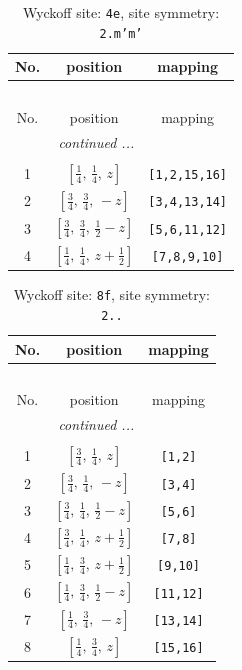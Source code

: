 \documentclass[fleqn,8pt]{jsarticle}
\begin{document}
\renewcommand{\arraystretch}{1.2}
\begin{longtable}{ccc}
\caption{Wyckoff site: {\tt 4e}, site symmetry: {\tt 2.m'm'}}
 \\
 \hline \hline
No. & position & mapping \\ \hline \endfirsthead

\multicolumn{2}{l}{\tablename\ \thetable{}} \\
 \hline \hline
No. & position & mapping \\ \hline \endhead

 \hline \hline
\multicolumn{2}{r}{\footnotesize\it continued ...} \\ \endfoot

 \hline \hline
\multicolumn{2}{r}{} \\ \endlastfoot

1 & $\left[ \frac{1}{4},\, \frac{1}{4},\, z \right]$ & {\tt [1,2,15,16]} \\ \hline
2 & $\left[ \frac{3}{4},\, \frac{3}{4},\, - z \right]$ & {\tt [3,4,13,14]} \\ \hline
3 & $\left[ \frac{3}{4},\, \frac{3}{4},\, \frac{1}{2} - z \right]$ & {\tt [5,6,11,12]} \\ \hline
4 & $\left[ \frac{1}{4},\, \frac{1}{4},\, z + \frac{1}{2} \right]$ & {\tt [7,8,9,10]} \\
\end{longtable}
\renewcommand{\arraystretch}{1.2}
\begin{longtable}{ccc}
\caption{Wyckoff site: {\tt 8f}, site symmetry: {\tt 2..}}
 \\
 \hline \hline
No. & position & mapping \\ \hline \endfirsthead

\multicolumn{2}{l}{\tablename\ \thetable{}} \\
 \hline \hline
No. & position & mapping \\ \hline \endhead

 \hline \hline
\multicolumn{2}{r}{\footnotesize\it continued ...} \\ \endfoot

 \hline \hline
\multicolumn{2}{r}{} \\ \endlastfoot

1 & $\left[ \frac{3}{4},\, \frac{1}{4},\, z \right]$ & {\tt [1,2]} \\ \hline
2 & $\left[ \frac{3}{4},\, \frac{1}{4},\, - z \right]$ & {\tt [3,4]} \\ \hline
3 & $\left[ \frac{3}{4},\, \frac{1}{4},\, \frac{1}{2} - z \right]$ & {\tt [5,6]} \\ \hline
4 & $\left[ \frac{3}{4},\, \frac{1}{4},\, z + \frac{1}{2} \right]$ & {\tt [7,8]} \\ \hline
5 & $\left[ \frac{1}{4},\, \frac{3}{4},\, z + \frac{1}{2} \right]$ & {\tt [9,10]} \\ \hline
6 & $\left[ \frac{1}{4},\, \frac{3}{4},\, \frac{1}{2} - z \right]$ & {\tt [11,12]} \\ \hline
7 & $\left[ \frac{1}{4},\, \frac{3}{4},\, - z \right]$ & {\tt [13,14]} \\ \hline
8 & $\left[ \frac{1}{4},\, \frac{3}{4},\, z \right]$ & {\tt [15,16]} \\
\end{longtable}
\end{document}
